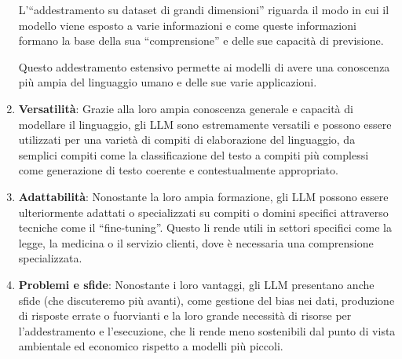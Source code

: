 \begin{enumerate}
                    L'``addestramento su dataset di grandi dimensioni'' riguarda il modo in cui il modello viene esposto a varie informazioni e come queste informazioni formano la base della sua ``comprensione'' e delle sue capacità di previsione.  
                    
                    Questo addestramento estensivo permette ai modelli di avere una conoscenza più ampia del linguaggio umano e delle sue varie applicazioni. 

                \item
                    \textbf{Versatilità}: Grazie alla loro ampia conoscenza generale e capacità di modellare il linguaggio, gli LLM sono estremamente versatili e possono essere utilizzati per una varietà di compiti di elaborazione del linguaggio, da semplici compiti come la classificazione del testo a compiti più complessi come generazione di testo coerente e contestualmente appropriato.   

                \item
                    \textbf{Adattabilità}: Nonostante la loro ampia formazione, gli LLM possono essere ulteriormente adattati o specializzati su compiti o domini specifici attraverso tecniche come il ``fine-tuning''. Questo li rende utili in settori specifici come la legge, la medicina o il servizio clienti, dove è necessaria una comprensione specializzata. 

                \item
                    \textbf{Problemi e sfide}: Nonostante i loro vantaggi, gli LLM presentano anche sfide (che discuteremo più avanti), come gestione del bias nei dati, produzione di risposte errate o fuorvianti e la loro grande necessità di risorse per l'addestramento e l'esecuzione, che li rende meno sostenibili dal punto di vista ambientale ed economico rispetto a modelli più piccoli. 
            \end{enumerate}
             

